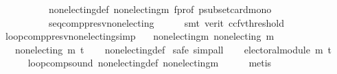 \begin{isabellebody}
\ \ \ \ \ \ \ \ \ \ non{\isacharunderscore}{\kern0pt}electing{\isacharunderscore}{\kern0pt}def\ non{\isacharunderscore}{\kern0pt}electing{\isacharunderscore}{\kern0pt}m\ f{\isacharunderscore}{\kern0pt}prof\ psubset{\isacharunderscore}{\kern0pt}card{\isacharunderscore}{\kern0pt}mono\isanewline
\ \ \ \ \ \ \ \ \ \ seq{\isacharunderscore}{\kern0pt}comp{\isacharunderscore}{\kern0pt}presv{\isacharunderscore}{\kern0pt}non{\isacharunderscore}{\kern0pt}electing\isanewline
\ \ \ \ \isamarkupfalse%
\ {\isacharparenleft}{\kern0pt}smt\ {\isacharparenleft}{\kern0pt}verit{\isacharcomma}{\kern0pt}\ ccfv{\isacharunderscore}{\kern0pt}threshold{\isacharparenright}{\kern0pt}{\isacharparenright}{\kern0pt}\isanewline
{}\isamarkupfalse%
%
\endisatagproof
{\isafoldproof}%
%
\isadelimproof
\isanewline
%
\endisadelimproof
\isanewline
\isanewline
{}\isamarkupfalse%
\ loop{\isacharunderscore}{\kern0pt}comp{\isacharunderscore}{\kern0pt}presv{\isacharunderscore}{\kern0pt}non{\isacharunderscore}{\kern0pt}electing{\isacharbrackleft}{\kern0pt}simp{\isacharbrackright}{\kern0pt}{\isacharcolon}{\kern0pt}\isanewline
\ \ \ non{\isacharunderscore}{\kern0pt}electing{\isacharunderscore}{\kern0pt}m{\isacharcolon}{\kern0pt}\ {\isachardoublequoteopen}non{\isacharunderscore}{\kern0pt}electing\ m{\isachardoublequoteclose}\isanewline
\ \ \ {\isachardoublequoteopen}non{\isacharunderscore}{\kern0pt}electing\ {\isacharparenleft}{\kern0pt}m\ {\isasymcirclearrowleft}\isactrlsub t{\isacharparenright}{\kern0pt}{\isachardoublequoteclose}\isanewline
%
\isadelimproof
\ \ %
\endisadelimproof
%
\isatagproof
{}\isamarkupfalse%
\ non{\isacharunderscore}{\kern0pt}electing{\isacharunderscore}{\kern0pt}def\isanewline
{}\isamarkupfalse%
\ {\isacharparenleft}{\kern0pt}safe{\isacharcomma}{\kern0pt}\ simp{\isacharunderscore}{\kern0pt}all{\isacharparenright}{\kern0pt}\isanewline
\ \ \isamarkupfalse%
\ {\isachardoublequoteopen}electoral{\isacharunderscore}{\kern0pt}module\ {\isacharparenleft}{\kern0pt}m\ {\isasymcirclearrowleft}\isactrlsub t{\isacharparenright}{\kern0pt}{\isachardoublequoteclose}\isanewline
\ \ \ \ \isamarkupfalse%
\ loop{\isacharunderscore}{\kern0pt}comp{\isacharunderscore}{\kern0pt}sound\ non{\isacharunderscore}{\kern0pt}electing{\isacharunderscore}{\kern0pt}def\ non{\isacharunderscore}{\kern0pt}electing{\isacharunderscore}{\kern0pt}m\isanewline
\ \ \ \ \isamarkupfalse%
\ metis\isanewline
{}\isamarkupfalse%
\isanewline
\ \ \ \ \isamarkupfalse%

\end{isabellebody}
